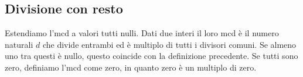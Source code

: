 \documentclass[a4paper]{article}
\begin{document}
\subsection{Divisione con resto}

Estendiamo l'mcd a valori tutti nulli.
Dati due interi il loro mcd è il numero naturali
\(d\) che divide entrambi ed è multiplo di tutti i divisori comuni.
Se almeno uno tra questi è nullo, questo coincide con la definizione precedente.
Se tutti sono zero, definiamo l'mcd come zero, in quanto zero è un multiplo di zero.
\end{document}
